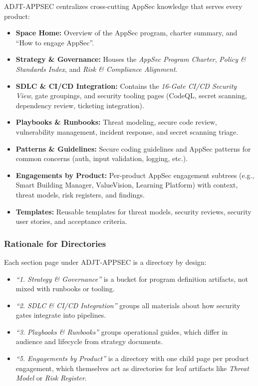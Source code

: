 \documentclass[11pt]{article}
\begin{document}
ADJT-APPSEC centralizes cross-cutting AppSec knowledge that serves
every product:

\begin{itemize}[leftmargin=*]
  \item \textbf{Space Home:} Overview of the AppSec program, charter
        summary, and ``How to engage AppSec''.
  \item \textbf{Strategy \& Governance:} Houses the
        \emph{AppSec Program Charter}, \emph{Policy \& Standards Index},
        and \emph{Risk \& Compliance Alignment}.
  \item \textbf{SDLC \& CI/CD Integration:} Contains the
        \emph{16-Gate CI/CD Security View}, gate groupings, and
        security tooling pages (CodeQL, secret scanning, dependency
        review, ticketing integration).
  \item \textbf{Playbooks \& Runbooks:} Threat modeling, secure code
        review, vulnerability management, incident response, and
        secret scanning triage.
  \item \textbf{Patterns \& Guidelines:} Secure coding guidelines and
        AppSec patterns for common concerns (auth, input validation,
        logging, etc.).
  \item \textbf{Engagements by Product:} Per-product AppSec
        engagement subtrees (e.g., Smart Building Manager, ValueVision,
        Learning Platform) with context, threat models, risk registers,
        and findings.
  \item \textbf{Templates:} Reusable templates for threat models,
        security reviews, security user stories, and acceptance
        criteria.
\end{itemize}

\subsubsection{Rationale for Directories}

Each section page under ADJT-APPSEC is a directory by design:

\begin{itemize}[leftmargin=*]
  \item \emph{``1. Strategy \& Governance''} is a bucket for program
        definition artifacts, not mixed with runbooks or tooling.
  \item \emph{``2. SDLC \& CI/CD Integration''} groups all materials
        about how security gates integrate into pipelines.
  \item \emph{``3. Playbooks \& Runbooks''} groups operational guides,
        which differ in audience and lifecycle from strategy documents.
  \item \emph{``5. Engagements by Product''} is a directory with one
        child page per product engagement, which themselves act as
        directories for leaf artifacts like \emph{Threat Model} or
        \emph{Risk Register}.
\end{itemize}
\end{document}
